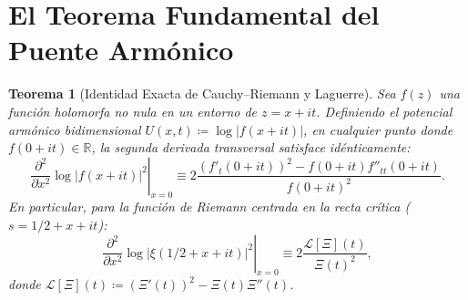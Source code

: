 \documentclass[11pt,a4paper]{article}
\newtheorem{theorem}{Teorema}[section]
\theoremstyle{definition}
\theoremstyle{remark}
\begin{document}
\section{El Teorema Fundamental del Puente Armónico}

\begin{theorem}[Identidad Exacta de Cauchy--Riemann y Laguerre]
\label{thm:puente_armonico_experto}
Sea $f(z)$ una función holomorfa no nula en un entorno de $z = x + it$. Definiendo el potencial armónico bidimensional $U(x, t) \coloneqq \log |f(x + it)|$, en cualquier punto donde $f(0 + it) \in \mathbb{R}$, la segunda derivada transversal satisface idénticamente:
\begin{equation}
\left.\frac{\partial^2}{\partial x^2}\log |f(x + it)|^2\right|_{x=0} \equiv 2 \frac{(f'_t(0+it))^2 - f(0+it) f''_{tt}(0+it)}{f(0+it)^2}.
\end{equation}
En particular, para la función de Riemann centrada en la recta crítica ($s = 1/2 + x + it$):
\begin{equation}
\left.\frac{\partial^2}{\partial x^2}\log |\xi(1/2 + x + it)|^2\right|_{x=0} \equiv 2 \frac{\mathcal{L}[\Xi](t)}{\Xi(t)^2},
\end{equation}
donde $\mathcal{L}[\Xi](t) \coloneqq (\Xi'(t))^2 - \Xi(t)\Xi''(t)$.
\end{theorem}
\end{document}
